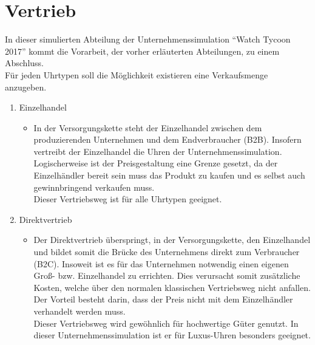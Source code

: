 \section{Vertrieb}
In dieser simulierten Abteilung der Unternehmenssimulation \enquote{Watch Tycoon 2017} kommt die Vorarbeit, der vorher erläuterten Abteilungen, zu einem Abschluss. \\
Für jeden Uhrtypen soll die Möglichkeit existieren eine Verkaufsmenge anzugeben. 
\begin{enumerate}
	\item Einzelhandel
\begin{itemize}
	\item In der Versorgungskette steht der Einzelhandel zwischen dem produzierenden Unternehmen und dem Endverbraucher (B2B). Insofern vertreibt der Einzelhandel die Uhren der Unternehmenssimulation. Logischerweise ist der Preisgestaltung eine Grenze gesetzt, da der Einzelhändler bereit sein muss das Produkt zu kaufen und es selbst auch gewinnbringend verkaufen muss. \\
	Dieser Vertriebsweg ist für alle Uhrtypen geeignet. 
\end{itemize}
	\item Direktvertrieb
\begin{itemize}
	\item Der Direktvertrieb überspringt, in der Versorgungskette, den Einzelhandel und bildet somit die Brücke des Unternehmens direkt zum Verbraucher (B2C). Insoweit ist es für das Unternehmen notwendig einen eigenen Groß- bzw. Einzelhandel zu errichten. Dies verursacht somit zusätzliche Kosten, welche über den normalen klassischen Vertriebsweg nicht anfallen. Der Vorteil besteht darin, dass der Preis nicht mit dem Einzelhändler verhandelt werden muss. \\
	Dieser Vertriebsweg wird gewöhnlich für hochwertige Güter genutzt. In dieser Unternehmenssimulation ist er für Luxus-Uhren besonders geeignet.
\end{itemize}
\end{enumerate}

